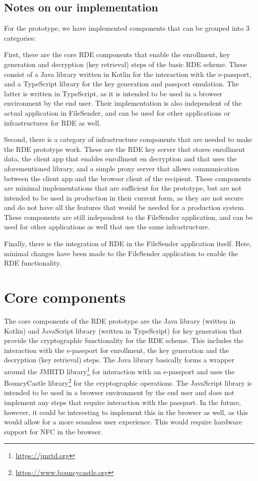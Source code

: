 \subsection{Notes on our implementation}\label{subsec:infrastructure-overview-notes-on-our-implementation}
For the prototype, we have implemented components that can be grouped into 3 categories:

First, there are the core RDE components that enable the enrollment, key generation and decryption (key retrieval) steps of the basic RDE scheme.
These consist of a Java library written in Kotlin for the interaction with the e-passport, and a TypeScript library for the key generation and passport emulation.
The latter is written in TypeScript, as it is intended to be used in a browser environment by the end user.
Their implementation is also independent of the actual application in FileSender, and can be used for other applications or infrastructures for RDE as well.

Second, there is a category of infrastructure components that are needed to make the RDE prototype work.
These are the RDE key server that stores enrollment data, the client app that enables enrollment en decryption and that uses the aforementioned library, and a simple proxy server that allows communication between the client app and the browser client of the recipient.
These components are minimal implementations that are sufficient for the prototype, but are not intended to be used in production in their current form, as they are not secure and do not have all the features that would be needed for a production system.
These components are still independent to the FileSender application, and can be used for other applications as well that use the same infrastructure.

Finally, there is the integration of RDE in the FileSender application itself.
Here, minimal changes have been made to the FileSender application to enable the RDE functionality.

\section{Core components}\label{sec:core-components}
The core components of the RDE prototype are the Java library (written in Kotlin) and JavaScript library (written in TypeScript) for key generation that provide the cryptographic functionality for the RDE scheme.
This includes the interaction with the e-passport for enrollment, the key generation and the decryption (key retrieval) steps.
The Java library basically forms a wrapper around the JMRTD library\footnote{\url{https://jmrtd.org}} for interaction with an e-passport and uses the BouncyCastle library\footnote{\url{https://www.bouncycastle.org}} for the cryptographic operations.
The JavaScript library is intended to be used in a browser environment by the end user and does not implement any steps that require interaction with the passport.
In the future, however, it could be interesting to implement this in the browser as well, as this would allow for a more seamless user experience.
This would require hardware support for NFC in the browser.

